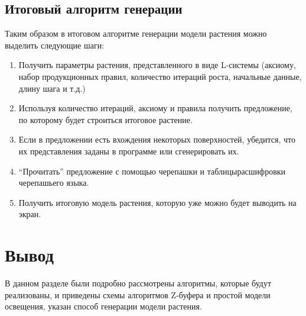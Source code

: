 \newpage

\subsection{Итоговый алгоритм генерации}

Таким образом в итоговом алгоритме генерации модели растения можно выделить следующие шаги:
\begin{enumerate}
    \item Получить параметры растения, представленного в виде L-системы (аксиому, набор продукционных правил, количество итераций роста, начальные данные, длину шага и т.д.)
    \item Используя количество итераций, аксиому и правила получить
предложение, по которому будет строиться итоговое растение.
    \item Если в предложении есть вхождения некоторых поверхностей, убедится, что их представления заданы в программе или сгенерировать их.
    \item “Прочитать” предложение с помощью черепашки и таблицырасшифровки черепашьего языка.
    \item Получить итоговую модель растения, которую уже можно будет
выводить на экран.
\end{enumerate}

\section*{Вывод}
В данном разделе были подробно рассмотрены алгоритмы, которые будут реализованы, и приведены схемы алгоритмов Z-буфера и простой модели освещения, указан способ генерации модели растения.
